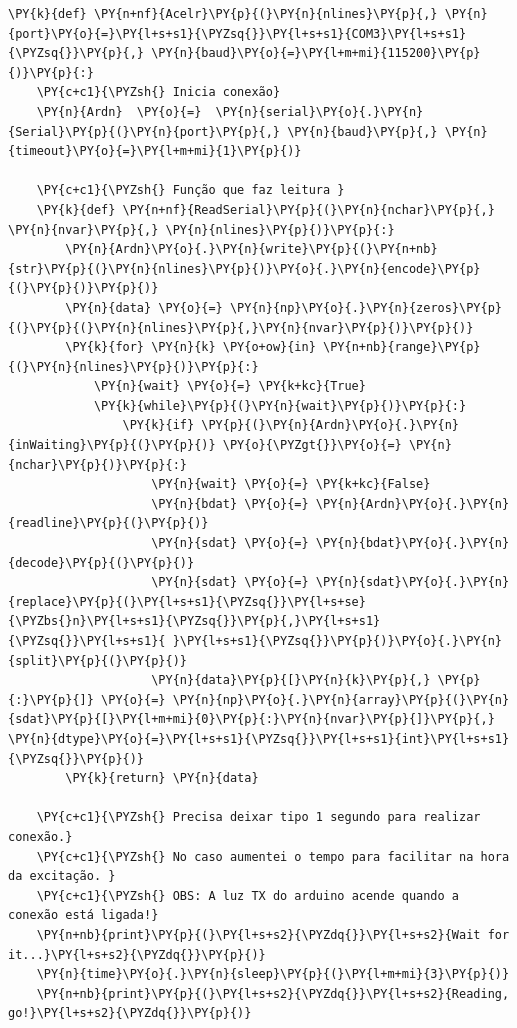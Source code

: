     \begin{tcolorbox}[breakable, size=fbox, boxrule=1pt, pad at break*=1mm,colback=cellbackground, colframe=cellborder]
\begin{Verbatim}[commandchars=\\\{\}]
\PY{k}{def} \PY{n+nf}{Acelr}\PY{p}{(}\PY{n}{nlines}\PY{p}{,} \PY{n}{port}\PY{o}{=}\PY{l+s+s1}{\PYZsq{}}\PY{l+s+s1}{COM3}\PY{l+s+s1}{\PYZsq{}}\PY{p}{,} \PY{n}{baud}\PY{o}{=}\PY{l+m+mi}{115200}\PY{p}{)}\PY{p}{:}
    \PY{c+c1}{\PYZsh{} Inicia conexão}
    \PY{n}{Ardn}  \PY{o}{=}  \PY{n}{serial}\PY{o}{.}\PY{n}{Serial}\PY{p}{(}\PY{n}{port}\PY{p}{,} \PY{n}{baud}\PY{p}{,} \PY{n}{timeout}\PY{o}{=}\PY{l+m+mi}{1}\PY{p}{)}

    \PY{c+c1}{\PYZsh{} Função que faz leitura }
    \PY{k}{def} \PY{n+nf}{ReadSerial}\PY{p}{(}\PY{n}{nchar}\PY{p}{,} \PY{n}{nvar}\PY{p}{,} \PY{n}{nlines}\PY{p}{)}\PY{p}{:}
        \PY{n}{Ardn}\PY{o}{.}\PY{n}{write}\PY{p}{(}\PY{n+nb}{str}\PY{p}{(}\PY{n}{nlines}\PY{p}{)}\PY{o}{.}\PY{n}{encode}\PY{p}{(}\PY{p}{)}\PY{p}{)}
        \PY{n}{data} \PY{o}{=} \PY{n}{np}\PY{o}{.}\PY{n}{zeros}\PY{p}{(}\PY{p}{(}\PY{n}{nlines}\PY{p}{,}\PY{n}{nvar}\PY{p}{)}\PY{p}{)}
        \PY{k}{for} \PY{n}{k} \PY{o+ow}{in} \PY{n+nb}{range}\PY{p}{(}\PY{n}{nlines}\PY{p}{)}\PY{p}{:}
            \PY{n}{wait} \PY{o}{=} \PY{k+kc}{True}
            \PY{k}{while}\PY{p}{(}\PY{n}{wait}\PY{p}{)}\PY{p}{:}
                \PY{k}{if} \PY{p}{(}\PY{n}{Ardn}\PY{o}{.}\PY{n}{inWaiting}\PY{p}{(}\PY{p}{)} \PY{o}{\PYZgt{}}\PY{o}{=} \PY{n}{nchar}\PY{p}{)}\PY{p}{:}
                    \PY{n}{wait} \PY{o}{=} \PY{k+kc}{False}
                    \PY{n}{bdat} \PY{o}{=} \PY{n}{Ardn}\PY{o}{.}\PY{n}{readline}\PY{p}{(}\PY{p}{)} 
                    \PY{n}{sdat} \PY{o}{=} \PY{n}{bdat}\PY{o}{.}\PY{n}{decode}\PY{p}{(}\PY{p}{)}
                    \PY{n}{sdat} \PY{o}{=} \PY{n}{sdat}\PY{o}{.}\PY{n}{replace}\PY{p}{(}\PY{l+s+s1}{\PYZsq{}}\PY{l+s+se}{\PYZbs{}n}\PY{l+s+s1}{\PYZsq{}}\PY{p}{,}\PY{l+s+s1}{\PYZsq{}}\PY{l+s+s1}{ }\PY{l+s+s1}{\PYZsq{}}\PY{p}{)}\PY{o}{.}\PY{n}{split}\PY{p}{(}\PY{p}{)}
                    \PY{n}{data}\PY{p}{[}\PY{n}{k}\PY{p}{,} \PY{p}{:}\PY{p}{]} \PY{o}{=} \PY{n}{np}\PY{o}{.}\PY{n}{array}\PY{p}{(}\PY{n}{sdat}\PY{p}{[}\PY{l+m+mi}{0}\PY{p}{:}\PY{n}{nvar}\PY{p}{]}\PY{p}{,} \PY{n}{dtype}\PY{o}{=}\PY{l+s+s1}{\PYZsq{}}\PY{l+s+s1}{int}\PY{l+s+s1}{\PYZsq{}}\PY{p}{)}
        \PY{k}{return} \PY{n}{data}

    \PY{c+c1}{\PYZsh{} Precisa deixar tipo 1 segundo para realizar conexão.}
    \PY{c+c1}{\PYZsh{} No caso aumentei o tempo para facilitar na hora da excitação. }
    \PY{c+c1}{\PYZsh{} OBS: A luz TX do arduino acende quando a conexão está ligada!}
    \PY{n+nb}{print}\PY{p}{(}\PY{l+s+s2}{\PYZdq{}}\PY{l+s+s2}{Wait for it...}\PY{l+s+s2}{\PYZdq{}}\PY{p}{)}
    \PY{n}{time}\PY{o}{.}\PY{n}{sleep}\PY{p}{(}\PY{l+m+mi}{3}\PY{p}{)}
    \PY{n+nb}{print}\PY{p}{(}\PY{l+s+s2}{\PYZdq{}}\PY{l+s+s2}{Reading, go!}\PY{l+s+s2}{\PYZdq{}}\PY{p}{)}


\end{Verbatim}
\end{tcolorbox}
